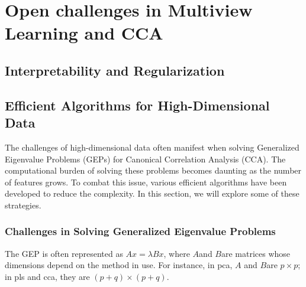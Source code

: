 \section{Open challenges in Multiview Learning and CCA}

\subsection{Interpretability and Regularization}



\subsection{Efficient Algorithms for High-Dimensional Data}

The challenges of high-dimensional data often manifest when solving Generalized Eigenvalue Problems (GEPs) for Canonical Correlation Analysis (CCA). The computational burden of solving these problems becomes daunting as the number of features grows.
To combat this issue, various efficient algorithms have been developed to reduce the complexity.
In this section, we will explore some of these strategies.

\subsubsection{Challenges in Solving Generalized Eigenvalue Problems}

The GEP is often represented as \( Ax = \lambda Bx \), where \( A \)and \( B \)are matrices whose dimensions depend on the method in use.
For instance, in \acrshort{pca}, \( A \) and \( B \)are \( p \times p \); in \acrshort{pls} and \acrshort{cca}, they are \( (p+q) \times (p+q) \).

